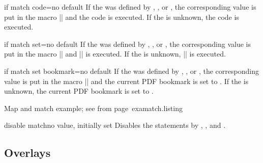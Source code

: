 \documentclass[a4paper,11pt]{ltxdoc}
\begin{document}
\begin{docIgrKey}{if match code}{=}{no default}
  If the  was defined by ,
  , or ,
  the corresponding value is put in the
  macro |\igrmatchvalue| and the  code is
  executed. If the  is unknown, the  code is
  executed.
\end{docIgrKey}

\begin{docIgrKey}{if match set}{=}{no default}
  If the  was defined by ,
  , or ,
  the corresponding value is put in the
  macro |\igrmatchvalue| and || is executed.
  If the  is unknown, || is executed.
\end{docIgrKey}

\begin{docIgrKey}{if match set bookmark}{=}{no default}
  If the  was defined by ,
  , or ,
  the corresponding value is put in the
  macro |\igrmatchvalue| and the current PDF bookmark is set to .
  If the  is unknown, the current PDF bookmark is set to .
\begin{texexptitled}%
  {Map and match example; see from page~\pageref{examatch.1}}{examatch.listing}
\end{texexptitled}
\end{docIgrKey}

\begin{docIgrKey}{disable match}{}{no value, initially set}
  Disables the statements by
  ,
  , and
  .
\end{docIgrKey}

\clearpage

\subsection{Overlays}
\end{document}
